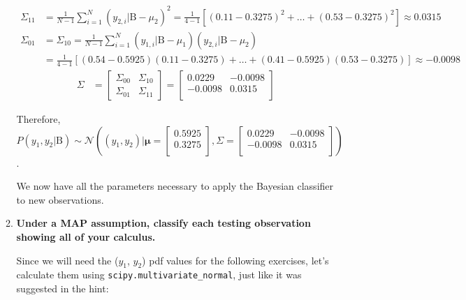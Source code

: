 \documentclass[12pt]{article}
\begin{document}
\begin{enumerate}[leftmargin=\labelsep]
\begin{enumerate}
$$\begin{aligned}
                    \Sigma_{11} & = \frac{1}{N-1} \sum^{N}_{i=1} (y_{2,i} | \text{B} - \mu_{2})^2 = \frac{1}{4-1} \left[(0.11-0.3275)^2 + \dots + (0.53-0.3275)^2\right] \approx 0.0315 \\
                    \Sigma_{01} & = \Sigma_{10} = \frac{1}{N-1} \sum^{N}_{i=1} (y_{1,i} | \text{B} - \mu_{1})(y_{2,i} | \text{B} - \mu_{2})                                             \\
                                & = \frac{1}{4-1} \left[(0.54-0.5925)(0.11-0.3275) + \dots + (0.41-0.5925)(0.53-0.3275)\right] \approx -0.0098
                  \end{aligned}
                $$
                $$
                  \begin{aligned}
                    \Sigma & = \begin{bmatrix}\Sigma_{00} & \Sigma_{10}\\ \Sigma_{01} & \Sigma_{11}\end{bmatrix} = \begin{bmatrix}0.0229 & -0.0098 \\-0.0098 & 0.0315 \\\end{bmatrix}
                  \end{aligned}
                $$

                Therefore, $P(y_1, y_2|\text{B}) \sim \mathcal{N}\left((y_1, y_2) | \boldsymbol{\mu} = \begin{bmatrix}0.5925 \\0.3275 \\\end{bmatrix},
                  \Sigma = \begin{bmatrix}0.0229 & -0.0098 \\-0.0098 & 0.0315 \\\end{bmatrix}\right)$.

                We now have all the parameters necessary to apply the Bayesian classifier to new observations.

          \item \textbf{Under a MAP assumption, classify each testing observation showing all of your calculus.} \label{ex:1b}

                \vskip 0.3cm
                Since we will need the ($y_1$, $y_2$) pdf values for the following exercises, let's calculate them using \texttt{scipy.multivariate\_normal}, just like it was suggested in the hint:


\end{enumerate}
\end{enumerate}
\end{document}
